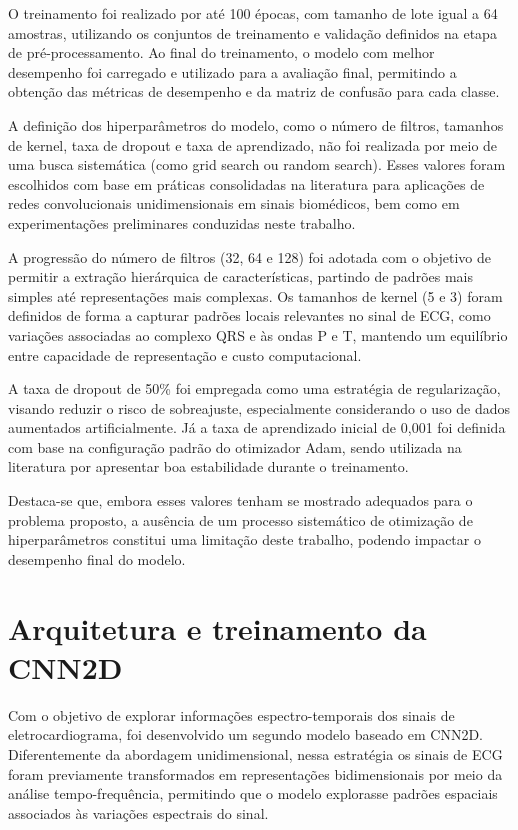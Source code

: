 O treinamento foi realizado por até 100 épocas, com tamanho de lote igual a 64 amostras, utilizando os conjuntos de treinamento e validação
definidos na etapa de pré-processamento. Ao final do treinamento, o modelo com melhor desempenho foi carregado e utilizado para a avaliação 
final, permitindo a obtenção das métricas de desempenho e da matriz de confusão para cada classe.

A definição dos hiperparâmetros do modelo, como o número de filtros, tamanhos de kernel, taxa de dropout e taxa de aprendizado, não foi realizada por 
meio de uma busca sistemática (como grid search ou random search). Esses valores foram escolhidos com base em práticas consolidadas na literatura para 
aplicações de redes convolucionais unidimensionais em sinais biomédicos, bem como em experimentações preliminares conduzidas neste trabalho.

A progressão do número de filtros (32, 64 e 128) foi adotada com o objetivo de permitir a extração hierárquica de características, partindo de padrões 
mais simples até representações mais complexas. Os tamanhos de kernel (5 e 3) foram definidos de forma a capturar padrões locais relevantes no sinal de 
ECG, como variações associadas ao complexo QRS e às ondas P e T, mantendo um equilíbrio entre capacidade de representação e custo computacional.

A taxa de dropout de 50\% foi empregada como uma estratégia de regularização, visando reduzir o risco de sobreajuste, especialmente considerando o uso 
de dados aumentados artificialmente. Já a taxa de aprendizado inicial de 0,001 foi definida com base na configuração padrão do otimizador Adam, sendo 
utilizada na literatura por apresentar boa estabilidade durante o treinamento.

Destaca-se que, embora esses valores tenham se mostrado adequados para o problema proposto, a ausência de um processo sistemático de otimização de 
hiperparâmetros constitui uma limitação deste trabalho, podendo impactar o desempenho final do modelo.

\section{Arquitetura e treinamento da CNN2D}

Com o objetivo de explorar informações espectro-temporais dos sinais de eletrocardiograma, foi desenvolvido um segundo modelo baseado em 
CNN2D. Diferentemente da abordagem unidimensional, nessa estratégia os sinais de ECG foram previamente transformados em representações 
bidimensionais por meio da análise tempo-frequência, permitindo que o modelo explorasse padrões espaciais associados às variações espectrais 
do sinal.

